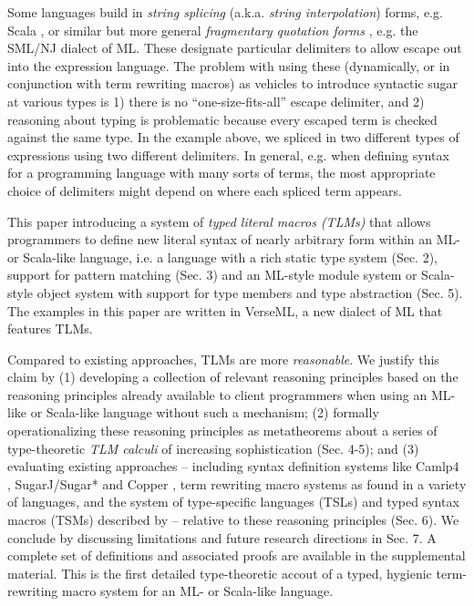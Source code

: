 \documentclass[acmsmall,10pt,review,anonymous]{acmart}\settopmatter{printfolios=true}
\begin{document}
  Some languages build in \emph{string splicing} (a.k.a. \emph{string interpolation}) forms, e.g. Scala \cite{odersky2008programming}, or similar but more general \emph{fragmentary quotation forms} \cite{conf/icfp/Slind91}, e.g. the SML/NJ dialect of ML. These designate particular delimiters to allow escape out into the expression language. The problem with using these (dynamically, or in conjunction with term rewriting macros) as vehicles to introduce syntactic sugar at various types is 1) there is no ``one-size-fits-all'' escape delimiter, and 2) reasoning about typing is problematic because every escaped term is checked against the same type. In the example above, we spliced in two different types of expressions using two different delimiters. In general, e.g. when defining syntax for a programming language with many sorts of terms, the most appropriate choice of delimiters might depend on where each spliced term appears.



{This paper introducing a system of \emph{typed literal macros (TLMs)} that allows programmers to define new literal syntax of nearly arbitrary form within an ML- or Scala-like  language}, i.e. a language with a rich static type system (Sec. 2), support for pattern matching (Sec. 3) and an ML-style module system or Scala-style object system with support for type members and type abstraction (Sec. 5). The examples in this paper are written in VerseML, a new dialect of ML that features TLMs.

Compared to existing approaches, TLMs are more \emph{reasonable}. We justify this claim by (1) developing a collection of relevant reasoning principles based on the reasoning principles already available to client programmers when using an ML-like or Scala-like language without such a mechanism; (2) formally operationalizing these reasoning principles as metatheorems about a series of type-theoretic \emph{TLM calculi} of increasing sophistication (Sec. 4-5); and (3) evaluating existing approaches -- including syntax definition systems like Camlp4 \cite{ocaml-manual}, SugarJ/Sugar* \cite{erdweg2011sugarj,erdweg2013framework} and Copper \cite{conf/pldi/SchwerdfegerW09,schwerdfeger2010context}, term rewriting macro systems as found in a variety of languages, and the system of type-specific languages (TSLs) and typed syntax macros (TSMs) described by \citet{TSLs,sac15} -- relative to these reasoning principles (Sec. 6). We conclude by discussing limitations and future research directions in Sec. 7. A complete set of definitions and associated proofs are available in the  supplemental material. This is the first detailed type-theoretic accout of a typed, hygienic term-rewriting macro system for an ML- or Scala-like language.
\end{document}

